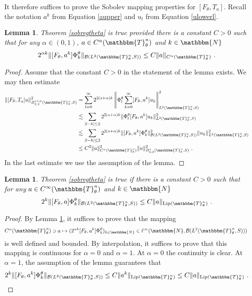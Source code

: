 \documentclass[10pt]{amsart}
\newtheorem{lem}[thm]{Lemma}
\theoremstyle{remark}
\theoremstyle{definition}
\begin{document}
It therefore suffices to prove the Sobolev mapping properties for $[F_\theta,T_a]$. Recall the notation $a^k$ from Equation \eqref{aupper} and $u_l$ from Equation \eqref{ulowerl}.

\begin{lem}
\label{alphainbetween}
Theorem \ref{sobregtheta} is true provided there is a constant $C>0$ such that for any $\alpha\in (0,1)$, $a\in C^\alpha({\mathbbm{T}}^n_\theta)$ and $k\in {\mathbbm{N}}$
$$2^{\alpha k}\|[F_\theta,a^k]\Phi_k^\theta\|_{{\mathcal{B}}(L^2({\mathbbm{T}}^n_\theta,S))}\leq C\|a\|_{C^\alpha({\mathbbm{T}}^n_\theta)}\ .$$
\end{lem}

\begin{proof}
Assume that the constant $C>0$ in the statement of the lemma exists. We may then estimate
\begin{align*}
\|[F_\theta,T_a]u\|_{B^{s+\alpha}_{2,2}({\mathbbm{T}}^n_\theta,S)}^2&=\sum_{l=0}^\infty 2^{2(s+\alpha)k} \left\|\Phi_l^\theta\sum_{k=0}^\infty[F_\theta,a^k]u_k\right\|_{L^2({\mathbbm{T}}^n_\theta,S)}^2\\
&\lesssim \sum_{|l-k|\leq 2} 2^{2(s+\alpha)k} \|\Phi_l^\theta[F_\theta,a^k]u_k\|_{L^2({\mathbbm{T}}^n_\theta,S)}^2\\
&\lesssim \sum_{|l-k|\leq 2} 2^{2(s+\alpha)k} \|[F_\theta,a^k]\Phi_k^\theta\|_{{\mathcal{B}}(L^2({\mathbbm{T}}^n_\theta,S))}^2\|u_k\|_{L^2({\mathbbm{T}}^n_\theta,S)}^2\\
& \leq C^2\|a\|_{C^\alpha({\mathbbm{T}}^n_\theta)}^2\|u\|_{B^{s}_{2,2}({\mathbbm{T}}^n_\theta,S)}^2\ .
\end{align*}
In the last estimate we use the assumption of the lemma.
\end{proof}

\begin{lem}
\label{smoothest}
Theorem \ref{sobregtheta} is true if there is a constant $C>0$ such that for any $a\in C^\infty({\mathbbm{T}}^n_\theta)$ and $k\in {\mathbbm{N}}$
$$2^{k}\|[F_\theta,a]\Phi_k^\theta\|_{{\mathcal{B}}(L^2({\mathbbm{T}}^n_\theta,S))}\leq C\|a\|_{{\textnormal{Lip}}({\mathbbm{T}}^n_\theta)}\ .$$
\end{lem}

\begin{proof}
By Lemma \ref{alphainbetween}, it suffices to prove that the mapping 
$$C^\alpha({\mathbbm{T}}^n_\theta)\ni a\mapsto (2^{\alpha k}[F_\theta,a^k]\Phi_k^\theta)_{k\in {\mathbbm{N}}}\in \ell^\infty({\mathbbm{N}},{\mathcal{B}}(L^2({\mathbbm{T}}^n_\theta,S)))\ $$
is well defined and bounded. By interpolation, it suffices to prove that this  mapping is continuous for $\alpha=0$ and $\alpha=1$. At $\alpha=0$ the continuity is clear. At $\alpha=1$, the assumption of the lemma guarantees that 
$$2^{k}\|[F_\theta,a^k]\Phi_k^\theta\|_{{\mathcal{B}}(L^2({\mathbbm{T}}^n_\theta,S))}\leq C\|a^k\|_{{\textnormal{Lip}}({\mathbbm{T}}^n_\theta)}\leq C\|a\|_{{\textnormal{Lip}}({\mathbbm{T}}^n_\theta)}\ .$$
\end{proof}
\end{document}
